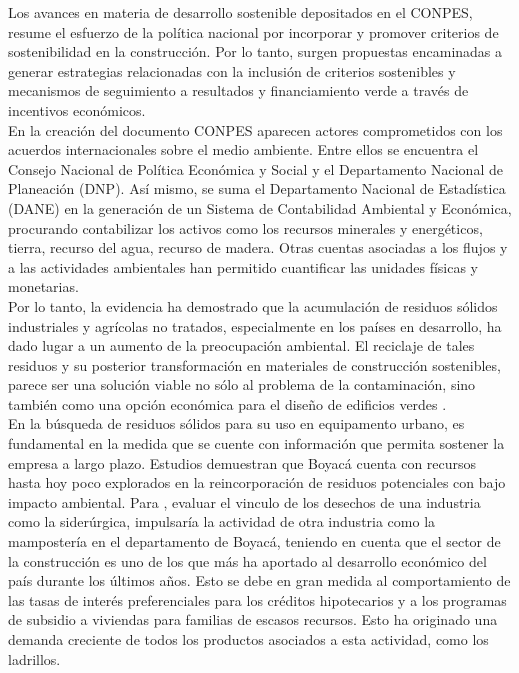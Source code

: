 \documentclass[12pt]{article}
\begin{document}
Los avances en materia de desarrollo sostenible depositados en el CONPES, resume el esfuerzo de la política nacional por incorporar y promover criterios de sostenibilidad en la construcción. Por lo tanto, surgen propuestas encaminadas a generar estrategias relacionadas con la inclusión de criterios sostenibles y mecanismos de seguimiento a resultados y financiamiento verde a través de incentivos económicos. \\

En la creación del documento CONPES aparecen actores comprometidos con los acuerdos internacionales sobre el medio ambiente. Entre ellos se encuentra el Consejo Nacional de Política Económica y Social y el Departamento Nacional de Planeación (DNP). Así mismo, se suma el Departamento Nacional de Estadística  (DANE) en la generación de un Sistema de Contabilidad Ambiental y Económica, procurando contabilizar los activos como los recursos minerales y energéticos, tierra, recurso del agua, recurso de madera. Otras cuentas asociadas a los flujos y a las actividades ambientales han permitido cuantificar las unidades físicas y monetarias.\\

Por lo tanto, la evidencia ha demostrado que la acumulación de residuos sólidos industriales y agrícolas no tratados, especialmente en los países en desarrollo, ha dado lugar a un aumento de la preocupación ambiental. El reciclaje de tales residuos y su posterior transformación en materiales de construcción sostenibles, parece ser una solución viable no sólo al problema de la contaminación, sino también como una opción económica para el diseño de edificios verdes \citep{raut2011development}.\\

En la búsqueda de residuos sólidos para su uso en equipamento urbano, es fundamental en la medida que se cuente con información que permita sostener la empresa a largo plazo. Estudios demuestran que Boyacá cuenta con recursos hasta hoy poco explorados en la reincorporación de residuos potenciales con bajo impacto ambiental. Para \cite{quijano2014implementacion}, evaluar el  vinculo de los desechos de una industria como la siderúrgica, impulsaría  la actividad de otra industria como la mampostería en el departamento de Boyacá, teniendo en cuenta que el sector de la construcción es uno de los que más ha aportado al desarrollo económico del país durante los últimos años. Esto se debe en gran medida al comportamiento de las tasas de interés preferenciales para los créditos hipotecarios y a los programas de subsidio a viviendas para familias de escasos recursos. Esto ha originado una demanda creciente de todos los productos asociados a esta actividad, como los ladrillos.\\
\end{document}
